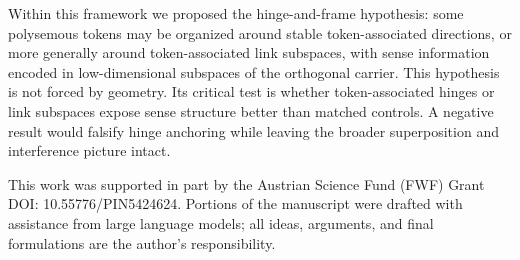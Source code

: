 \documentclass[
  aps,
  reprint,
  superscriptaddress,
  floatfix,
  nofootinbib,
  longbibliography
]{revtex4-2}
\begin{document}
Within this framework we proposed the hinge-and-frame hypothesis: some
polysemous tokens may be organized around stable token-associated
directions, or more generally around token-associated link subspaces,
with sense information encoded in low-dimensional subspaces of the
orthogonal carrier. This hypothesis is not forced by geometry. Its
critical test is whether token-associated hinges or link subspaces
expose sense structure better than matched controls. A negative result
would falsify hinge anchoring while leaving the broader superposition
and interference picture intact.

\begin{acknowledgments}
This work was supported in part by the Austrian Science Fund (FWF)
Grant DOI: 10.55776/PIN5424624. Portions of the manuscript were drafted
with assistance from large language models; all ideas, arguments, and
final formulations are the author's responsibility.
\end{acknowledgments}


\end{document}
